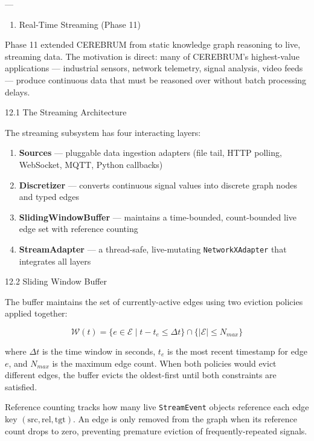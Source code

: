\documentclass[10pt,journal,compsoc]{IEEEtran}
\begin{document}
---

\begin{enumerate}
\item Real-Time Streaming (Phase 11)

\end{enumerate}
Phase 11 extended CEREBRUM from static knowledge graph reasoning to live, streaming data. The motivation is direct: many of CEREBRUM's highest-value appli\-cations — industrial sensors, network telemetry, signal analysis, video feeds — produce continuous data that must be reasoned over without batch processing delays.

12.1 The Streaming Archit\-ecture

The streaming subsystem has four interacting layers:

\begin{enumerate}
\item \textbf{Sources} — pluggable data ingestion adapters (file tail, HTTP polling, WebSocket, MQTT, Python callbacks)
\item \textbf{Discretizer} — converts continuous signal values into discrete graph nodes and typed edges
\item \textbf{SlidingWindowBuffer} — maintains a time-bounded, count-bounded live edge set with reference counting
\item \textbf{StreamAdapter} — a thread-safe, live-mutating \texttt{NetworkXAdapter} that integrates all layers

\end{enumerate}
12.2 Sliding Window Buffer

The buffer maintains the set of currently-active edges using two eviction policies applied together:

\begin{equation}
\mathcal{W}(t) = \{e \in \mathcal{E} \mid t - t_e \leq \Delta t\} \cap \{|\mathcal{E}| \leq N_{max}\}
\end{equation}

where $\Delta t$ is the time window in seconds, $t_e$ is the most recent timestamp for edge $e$, and $N_{max}$ is the maximum edge count. When both policies would evict different edges, the buffer evicts the oldest-first until both constraints are satisfied.

Reference counting tracks how many live \texttt{StreamEvent} objects reference each edge key $(\text{src}, \text{rel}, \text{tgt})$. An edge is only removed from the graph when its reference count drops to zero, preventing premature eviction of frequently-repeated signals.
\end{document}
